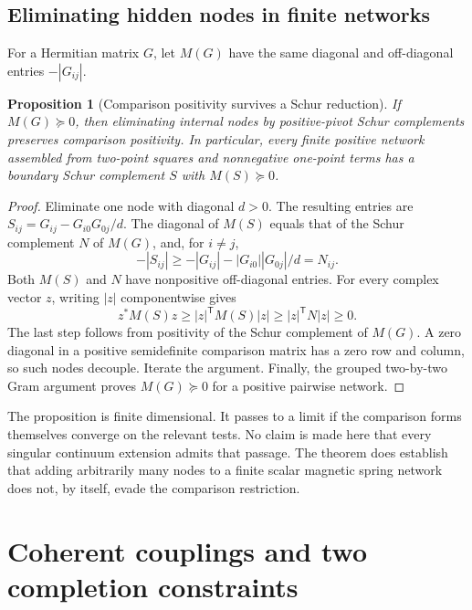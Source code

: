 \documentclass[11pt]{article}
\numberwithin{equation}{section}
\newtheorem{proposition}[theorem]{Proposition}
\theoremstyle{definition}
\theoremstyle{remark}
\begin{document}
\subsection{Eliminating hidden nodes in finite networks}

For a Hermitian matrix $G$, let $M(G)$ have the same diagonal and
off-diagonal entries $-|G_{ij}|$.

\begin{proposition}[Comparison positivity survives a Schur reduction]
\label{prop:schur}
If $M(G)\succeq0$, then eliminating internal nodes by positive-pivot
Schur complements preserves comparison positivity. In particular, every
finite positive network assembled from two-point squares and nonnegative
one-point terms has a boundary Schur complement $S$ with $M(S)\succeq0$.
\end{proposition}
\begin{proof}
Eliminate one node with diagonal $d>0$. The resulting entries are
$S_{ij}=G_{ij}-G_{i0}G_{0j}/d$. The diagonal of $M(S)$ equals that of
the Schur complement $N$ of $M(G)$, and, for $i\ne j$,
\begin{equation}
-|S_{ij}|\geq-|G_{ij}|-|G_{i0}||G_{0j}|/d=N_{ij}.
\end{equation}
Both $M(S)$ and $N$ have nonpositive off-diagonal entries. For every
complex vector $z$, writing $|z|$ componentwise gives
\begin{equation}
z^*M(S)z\geq |z|^{\mathsf T}M(S)|z|
\geq |z|^{\mathsf T}N|z|\geq0.
\end{equation}
The last step follows from positivity of the Schur complement of
$M(G)$. A zero diagonal in a positive semidefinite comparison matrix
has a zero row and column, so such nodes decouple. Iterate the argument.
Finally, the grouped two-by-two Gram argument proves $M(G)\succeq0$
for a positive pairwise network.
\end{proof}

The proposition is finite dimensional. It passes to a limit if the
comparison forms themselves converge on the relevant tests. No claim is
made here that every singular continuum extension admits that passage.
The theorem does establish that adding arbitrarily many nodes to a
finite scalar magnetic spring network does not, by itself, evade the
comparison restriction.

\section{Coherent couplings and two completion constraints}
\label{sec:coherent}
\end{document}
